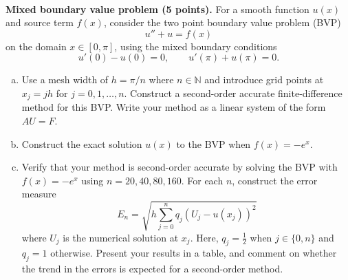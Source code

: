 \documentclass{article}
\def\N{{\mathbb N}}
\begin{document}
\begin{problem} \\ 
  \textbf{Mixed boundary value problem (5 points).}
        For a smooth function $u(x)$ and source term $f(x)$, consider the two
        point boundary value problem (BVP)
        \begin{equation}
          u''+u = f(x)
        \end{equation}
        on the domain $x\in [0,\pi]$, using the mixed boundary conditions
        \begin{equation}
          u'(0) - u(0) = 0, \qquad u'(\pi) + u(\pi) =0.
        \end{equation}
        \begin{enumerate}[(a)]
          \item Use a mesh width of $h=\pi/n$ where $n\in \N$ and introduce grid
                points at $x_j=jh$ for $j=0,1,\ldots, n$. Construct a second-order
                accurate finite-difference method for this BVP. Write
                your method as a linear system of the form $AU=F$.
          \item Construct the exact solution $u(x)$ to the BVP when $f(x)=-e^x$.
          \item Verify that your method is second-order accurate by solving the BVP
                with $f(x)=-e^x$ using $n=20,40,80,160$. For each $n$, construct the
                error measure
                \begin{equation}
                  E_n = \sqrt{ h \sum_{j=0}^n q_j (U_j - u(x_j))^2 }
                \end{equation}
                where $U_j$ is the numerical solution at $x_j$. Here, $q_j = \tfrac12$
                when $j\in \{0,n\}$ and $q_j=1$ otherwise. Present your results in a
                table, and comment on whether the trend in the errors is expected for a
                second-order method.
        \end{enumerate}
\end{problem}
\end{document}
